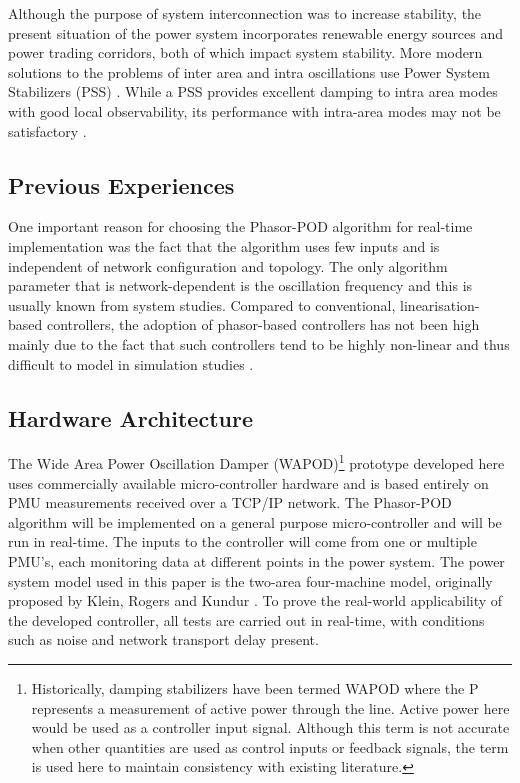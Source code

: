 \documentclass[journal]{IEEEtran}
\begin{document}
Although the purpose of system interconnection was to increase stability, the present situation of the power system incorporates renewable energy sources and power trading corridors, both of which impact system stability. More modern solutions to the problems of inter area and intra oscillations use Power System Stabilizers (PSS) \cite{Dmello}. While a PSS provides excellent damping to intra area modes with good local observability, its performance with intra-area modes may not be satisfactory \cite{localREMcomparison}.\\


\subsection{Previous Experiences}

One important reason for choosing the Phasor-POD algorithm for real-time implementation was the fact that the algorithm uses few inputs and is independent of network configuration and topology. The only algorithm parameter that is network-dependent is the oscillation frequency and this is usually known from system studies. Compared to conventional, linearisation-based controllers, the adoption of phasor-based controllers has not been high mainly due to the fact that such controllers tend to be highly non-linear and thus difficult to model in simulation studies \cite{Chaudhuri}.

\subsection{Hardware Architecture}

The Wide Area Power Oscillation Damper (WAPOD)\footnote{Historically, damping stabilizers have been termed WAPOD where the P represents a measurement of active power through the line. Active power here would be used as a controller input signal. Although this term is not accurate when other quantities are used as control inputs or feedback signals, the term is used here to maintain consistency with existing literature.} prototype developed here uses commercially available micro-controller hardware and is based entirely on PMU measurements received over a TCP/IP network. The Phasor-POD algorithm \cite{PhasorPOD} will be implemented on a general purpose micro-controller and will be run in real-time. The inputs to the controller will come from one or multiple PMU's, each monitoring data at different points in the power system. The power system model used in this paper is the two-area four-machine model, originally proposed by Klein, Rogers and Kundur \cite{KundurTwoArea}. To prove the real-world applicability of the developed controller, all tests are carried out in real-time, with conditions such as noise and network transport delay present.\\
\end{document}
